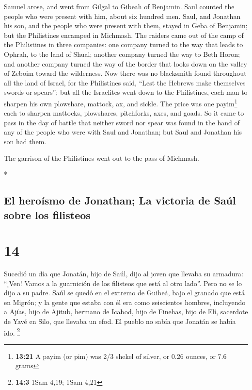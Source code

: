 \begin{paracol}{2}
\begin{otherlanguage}{english}
 Samuel arose, and went from Gilgal to Gibeah of
Benjamin. Saul counted the people who were present with him, about six
hundred men.  Saul, and Jonathan his son, and the people
who were present with them, stayed in Geba of Benjamin; but the
Philistines encamped in Michmash.  The raiders came out
of the camp of the Philistines in three companies: one company turned to
the way that leads to Ophrah, to the land of Shual; 
another company turned the way to Beth Horon; and another company turned
the way of the border that looks down on the valley of Zeboim toward the
wilderness.  Now there was no blacksmith found throughout
all the land of Israel, for the Philistines said, ``Lest the Hebrews
make themselves swords or spears'';  but all the
Israelites went down to the Philistines, each man to sharpen his own
plowshare, mattock, ax, and sickle.  The price was one
payim\footnote{\textbf{13:21} A payim (or pim) was 2/3 shekel of silver,
  or 0.26 ounces, or 7.6 grams} each to sharpen mattocks, plowshares,
pitchforks, axes, and goads.  So it came to pass in the
day of battle that neither sword nor spear was found in the hand of any
of the people who were with Saul and Jonathan; but Saul and Jonathan his
son had them.

 The garrison of the Philistines went out to the pass of
Michmash.

\end{otherlanguage}

\switchcolumn[0]*

\hypertarget{el-herouxedsmo-de-jonathan-la-victoria-de-sauxfal-sobre-los-filisteos}{%
\subsection{El heroísmo de Jonathan; La victoria de Saúl sobre los
filisteos}\label{el-herouxedsmo-de-jonathan-la-victoria-de-sauxfal-sobre-los-filisteos}}

\hypertarget{section-26}{%
\section{14}\label{section-26}}

 Sucedió un día que Jonatán, hijo de Saúl, dijo al joven
que llevaba su armadura: ``¡Ven! Vamos a la guarnición de los filisteos
que está al otro lado''. Pero no se lo dijo a su padre. 
Saúl se quedó en el extremo de Guibeá, bajo el granado que está en
Migrón; y la gente que estaba con él era como seiscientos hombres,
 incluyendo a Ajías, hijo de Ajitub, hermano de Icabod,
hijo de Finehas, hijo de Elí, sacerdote de Yavé en Silo, que llevaba un
efod. El pueblo no sabía que Jonatán se había ido. \footnote{\textbf{14:3}
  1Sam 4,19; 1Sam 4,21}


\end{paracol}
